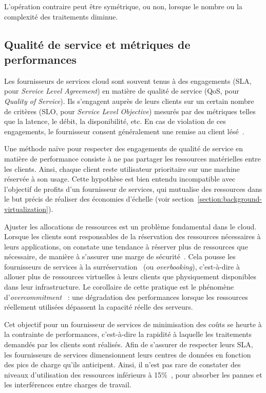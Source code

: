 L'opération contraire peut être symétrique, ou non, lorsque le nombre ou la complexité des traitements diminue.

\subsection{Qualité de service et métriques de performances}

Les fournisseurs de services cloud sont souvent tenus à des engagements (\gls{SLA}, pour \textit{Service Level Agreement}) en matière de qualité de service (\gls{QoS}, pour \textit{Quality of Service}). Ils s'engagent auprès de leurs clients sur un certain nombre de critères (\gls{SLO}, pour \textit{Service Level Objective}) mesurés par des métriques telles que la latence, le débit, la disponibilité, etc. En cas de violation de ces engagements, le fournisseur consent généralement une remise au client lésé~\cite{buyyaSLAorientedResourceProvisioning2011}.

Une méthode naïve pour respecter des engagements de qualité de service en matière de performance consiste à ne pas partager les ressources matérielles entre les clients. Ainsi, chaque client reste utilisateur prioritaire sur une machine réservée à son usage. Cette hypothèse est bien entendu incompatible avec l'objectif de profits d'un fournisseur de services, qui mutualise des ressources dans le but précis de réaliser des économies d'échelle (voir section~\ref{section:background-virtualization}).

Ajuster les allocations de ressources est un problème fondamental dans le cloud. Lorsque les clients sont responsables de la réservation des ressources nécessaires à leurs applications, on constate une tendance à réserver plus de ressources que nécessaire, de manière à s'assurer une marge de sécurité~\cite{rzadcaAutopilotWorkloadAutoscaling2020}. Cela pousse les fournisseurs de services à la surréservation~\cite{tomasImprovingCloudInfrastructure2013} (ou \textit{overbooking}), c'est-à-dire à allouer plus de ressources virtuelles à leurs clients que physiquement disponibles dans leur infrastructure. Le corollaire de cette pratique est le phénomène d'\textit{overcommitment}~\cite{bashirTakeItLimit2021} : une dégradation des performances lorsque les ressources réellement utilisées dépassent la capacité réelle des serveurs.

Cet objectif pour un fournisseur de services de minimisation des coûts se heurte à la contrainte de performances, c'est-à-dire la rapidité à laquelle les traitements demandés par les clients sont réalisés. Afin de s'assurer de respecter leurs \gls{SLA}, les fournisseurs de services dimensionnent leurs centres de données en fonction des pics de charge qu'ils anticipent. Ainsi, il n'est pas rare de constater des niveaux d'utilisation des ressources inférieurs à 15\%~\cite{vasanWorthTheirWatts2010, vermaLargescaleClusterManagement2015a}, pour absorber les pannes et les interférences entre charges de travail.

